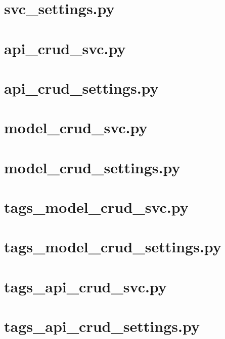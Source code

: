 \documentclass[a4paper,8pt]{article}
\begin{document}
\section{svc\_settings.py}


\section{api\_crud\_svc.py}


\section{api\_crud\_settings.py}


\section{model\_crud\_svc.py}


\section{model\_crud\_settings.py}


\section{tags\_model\_crud\_svc.py}


\section{tags\_model\_crud\_settings.py}


\section{tags\_api\_crud\_svc.py}


\section{tags\_api\_crud\_settings.py}

\end{document}
